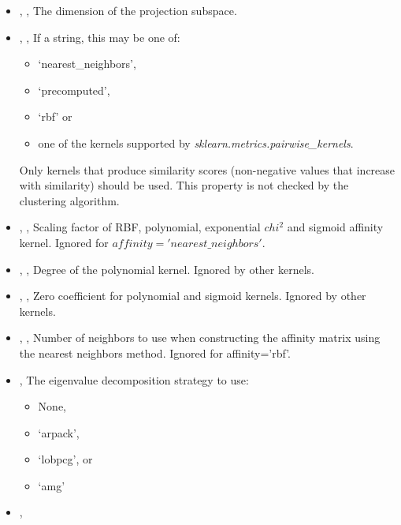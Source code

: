 \begin{itemize}
	\item {}, ,
	The dimension of the projection subspace.
	\item {}, , If a string, this may be one of:
	\begin{itemize}
		\item ‘nearest\_neighbors’,
		\item ‘precomputed’,
		\item ‘rbf’ or
		\item one of the kernels supported by \textit{sklearn.metrics.pairwise\_kernels}.
	\end{itemize}
	Only kernels that produce similarity scores (non-negative values that increase
	with similarity) should be used. This property is not checked by the clustering
	 algorithm. 
	\item {}, , Scaling factor of RBF,
	polynomial, exponential $chi^2$ and sigmoid affinity kernel.
	Ignored for $affinity='nearest\_neighbors'$. 
	\item {}, , Degree of the polynomial
	 kernel. Ignored by other kernels. 
	\item {}, , Zero coefficient for
	polynomial and sigmoid kernels. Ignored by other kernels. 
	\item {}, , Number of neighbors
	to use when constructing the affinity matrix using the nearest neighbors method.
	Ignored for affinity='rbf'. 
	\item {} ,  The eigenvalue
	decomposition strategy to use:
	\begin{itemize}
		\item None,
		\item ‘arpack’,
		\item ‘lobpcg’, or
		\item ‘amg’
	\end{itemize}
	\item {}, 
\end{itemize}
